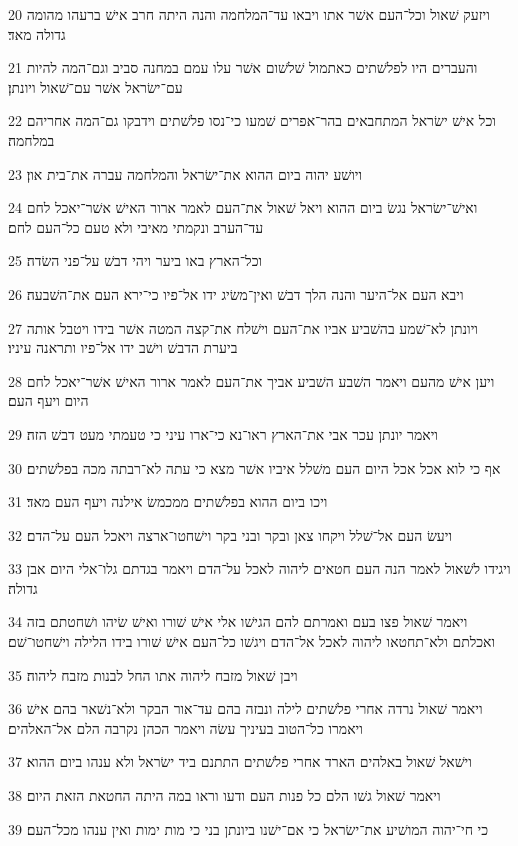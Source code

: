 \par 20 ויזעק שׁאול וכל־העם אשׁר אתו ויבאו עד־המלחמה והנה היתה חרב אישׁ ברעהו מהומה גדולה מאד׃
\par 21 והעברים היו לפלשׁתים כאתמול שׁלשׁום אשׁר עלו עמם במחנה סביב וגם־המה להיות עם־ישׂראל אשׁר עם־שׁאול ויונתן׃
\par 22 וכל אישׁ ישׂראל המתחבאים בהר־אפרים שׁמעו כי־נסו פלשׁתים וידבקו גם־המה אחריהם במלחמה׃
\par 23 ויושׁע יהוה ביום ההוא את־ישׂראל והמלחמה עברה את־בית און׃
\par 24 ואישׁ־ישׂראל נגשׂ ביום ההוא ויאל שׁאול את־העם לאמר ארור האישׁ אשׁר־יאכל לחם עד־הערב ונקמתי מאיבי ולא טעם כל־העם לחם׃
\par 25 וכל־הארץ באו ביער ויהי דבשׁ על־פני השׂדה׃
\par 26 ויבא העם אל־היער והנה הלך דבשׁ ואין־משׂיג ידו אל־פיו כי־ירא העם את־השׁבעה׃
\par 27 ויונתן לא־שׁמע בהשׁביע אביו את־העם וישׁלח את־קצה המטה אשׁר בידו ויטבל אותה ביערת הדבשׁ וישׁב ידו אל־פיו ותראנה עיניו׃
\par 28 ויען אישׁ מהעם ויאמר השׁבע השׁביע אביך את־העם לאמר ארור האישׁ אשׁר־יאכל לחם היום ויעף העם׃
\par 29 ויאמר יונתן עכר אבי את־הארץ ראו־נא כי־ארו עיני כי טעמתי מעט דבשׁ הזה׃
\par 30 אף כי לוא אכל אכל היום העם משׁלל איביו אשׁר מצא כי עתה לא־רבתה מכה בפלשׁתים׃
\par 31 ויכו ביום ההוא בפלשׁתים ממכמשׂ אילנה ויעף העם מאד׃
\par 32 ויעשׂ העם אל־שׁלל ויקחו צאן ובקר ובני בקר וישׁחטו־ארצה ויאכל העם על־הדם׃
\par 33 ויגידו לשׁאול לאמר הנה העם חטאים ליהוה לאכל על־הדם ויאמר בגדתם גלו־אלי היום אבן גדולה׃
\par 34 ויאמר שׁאול פצו בעם ואמרתם להם הגישׁו אלי אישׁ שׁורו ואישׁ שׂיהו ושׁחטתם בזה ואכלתם ולא־תחטאו ליהוה לאכל אל־הדם ויגשׁו כל־העם אישׁ שׁורו בידו הלילה וישׁחטו־שׁם׃
\par 35 ויבן שׁאול מזבח ליהוה אתו החל לבנות מזבח ליהוה׃
\par 36 ויאמר שׁאול נרדה אחרי פלשׁתים לילה ונבזה בהם עד־אור הבקר ולא־נשׁאר בהם אישׁ ויאמרו כל־הטוב בעיניך עשׂה ויאמר הכהן נקרבה הלם אל־האלהים׃
\par 37 וישׁאל שׁאול באלהים הארד אחרי פלשׁתים התתנם ביד ישׂראל ולא ענהו ביום ההוא׃
\par 38 ויאמר שׁאול גשׁו הלם כל פנות העם ודעו וראו במה היתה החטאת הזאת היום׃
\par 39 כי חי־יהוה המושׁיע את־ישׂראל כי אם־ישׁנו ביונתן בני כי מות ימות ואין ענהו מכל־העם׃
